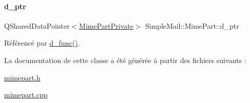 \paragraph{\texorpdfstring{d\+\_\+ptr}{d\_ptr}}
{\footnotesize\ttfamily Q\+Shared\+Data\+Pointer$<$\hyperlink{class_simple_mail_1_1_mime_part_private}{Mime\+Part\+Private}$>$ Simple\+Mail\+::\+Mime\+Part\+::d\+\_\+ptr\hspace{0.3cm}{\ttfamily [protected]}}



Référencé par \hyperlink{class_simple_mail_1_1_mime_part_aae9030aebac36f316718eeea6afc5971}{d\+\_\+func()}.



La documentation de cette classe a été générée à partir des fichiers suivants \+:\begin{DoxyCompactItemize}
\item 
\hyperlink{mimepart_8h}{mimepart.\+h}\item 
\hyperlink{mimepart_8cpp}{mimepart.\+cpp}\end{DoxyCompactItemize}
